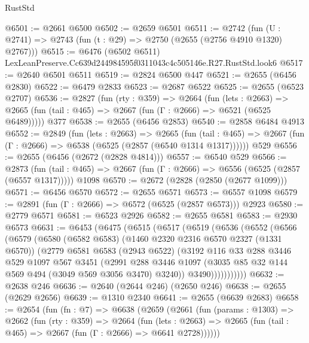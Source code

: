 \begin{lexlean}{RustStd}
\begin{coremodule}
@6501 := @2661 @6500
@6502 := @2659 @6501
@6511 := @2742 (fun (U : @2741) => @2743 (fun (t : @29) => @2750 (@2655 (@2756 @4910 @1320) @2767)))
@6515 := @6476 (@6502 @6511) LexLeanPreserve.Cc639d244984595f0311043c4c505146e.R27.RustStd.look6
@6517 := @2640 @6501 @6511
@6519 := @2824 @6500 @447
@6521 := @2655 (@6456 @2830)
@6522 := @6479 @2833
@6523 := @2687 @6522
@6525 := @2655 (@6523 @2707)
@6536 := @2827
    (fun (rty : @359) =>
    @2664
      (fun (lets : @2663) =>
      @2665 (fun (tail : @465) => @2667 (fun (Γ : @2666) => @6521 (@6525 @6489)))))
    @377
@6538 := @2655 (@6456 @2853)
@6540 := @2858 @6484 @4913
@6552 := @2849
    (fun (lets : @2663) =>
    @2665
      (fun (tail : @465) => @2667 (fun (Γ : @2666) => @6538 (@6525 (@2857 (@6540 @1314 @1317))))))
    @529
@6556 := @2655 (@6456 (@2672 (@2828 @4814)))
@6557 := @6540 @529
@6566 := @2873
    (fun (tail : @465) => @2667 (fun (Γ : @2666) => @6556 (@6525 (@2857 (@6557 @1317)))))
    @1098
@6570 := @2672 (@2828 (@2850 (@2677 @1099)))
@6571 := @6456 @6570
@6572 := @2655 @6571
@6573 := @6557 @1098
@6579 := @2891 (fun (Γ : @2666) => @6572 (@6525 (@2857 @6573))) @2923
@6580 := @2779 @6571
@6581 := @6523 @2926
@6582 := @2655 @6581
@6583 := @2930 @6573
@6631 := @6453
    (@6475
      (@6515
        (@6517
          (@6519
            (@6536
              (@6552
                (@6566
                  (@6579
                    (@6580
                      (@6582 @6583)
                      (@1460 @2320 @2316 @6570 @2327 (@1331 @6570))
                      (@2779
                        @6581
                        @6583
                        (@2943 @6522)
                        (@3192
                          @116
                          @33
                          @288
                          @3446
                          @529
                          @1097
                          @567
                          @3451
                          (@2991
                            @288
                            @3446
                            @1097
                            (@3035 @85 @32 @144 @569 @494 (@3049 @569 @3056 @3470) @3240))
                          @3490)))))))))))
@6632 := @2638 @246
@6636 := @2640 (@2644 @246) (@2650 @246)
@6638 := @2655 (@2629 @2656)
@6639 := @1310 @2340
@6641 := @2655 (@6639 @2683)
@6658 := @2654
    (fun (fn : @7) =>
    @6638
      (@2659
        (@2661
          (fun (params : @1303) =>
          @2662
            (fun (rty : @359) =>
            @2664
              (fun (lets : @2663) =>
              @2665 (fun (tail : @465) => @2667 (fun (Γ : @2666) => @6641 @2728))))))

\end{coremodule}
\end{lexlean}
